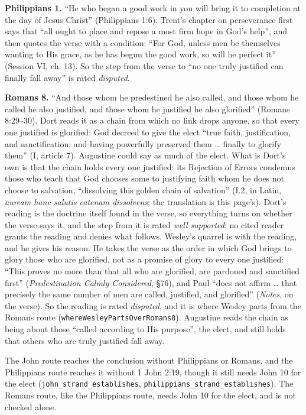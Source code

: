 \documentclass[11pt]{article}
\begin{document}
\textbf{Philippians 1.} “He who began a good work in you will bring it to completion at the day of Jesus Christ” (Philippians 1:6). Trent’s chapter on perseverance first says that “all ought to place and repose a most firm hope in God’s help”, and then quotes the verse with a condition: “For God, unless men be themselves wanting to His grace, as he has begun the good work, so will he perfect it” (Session VI, ch. 13). So the step from the verse to “no one truly justified can finally fall away” is rated \emph{disputed}.

\textbf{Romans 8.} “And those whom he predestined he also called, and those whom he called he also justified, and those whom he justified he also glorified” (Romans 8:29–30). Dort reads it as a chain from which no link drops anyone, so that every one justified is glorified: God decreed to give the elect “true faith, justification, and sanctification; and having powerfully preserved them … finally to glorify them” (I, article 7). Augustine could say as much of the elect. What is Dort’s own is that the chain holds every one justified: its Rejection of Errors condemns those who teach that God chooses some to justifying faith whom he does not choose to salvation, “dissolving this golden chain of salvation” (I.2, in Latin, \emph{auream hanc salutis catenam dissolvens}; the translation is this page’s). Dort’s reading is the doctrine itself found in the verse, so everything turns on whether the verse says it, and the step from it is rated \emph{well supported}: no cited reader grants the reading and denies what follows. Wesley’s quarrel is with the reading, and he gives his reason. He takes the verse as the order in which God brings to glory those who are glorified, not as a promise of glory to every one justified: “This proves no more than that all who are glorified, are pardoned and sanctified first” (\emph{Predestination Calmly Considered}, §76), and Paul “does not affirm … that precisely the same number of men are called, justified, and glorified” (\emph{Notes}, on the verse). So the reading is rated \emph{disputed}, and it is where Wesley parts from the Romans route (\texttt{where\allowbreak{}Wesley\allowbreak{}Parts\allowbreak{}Over\allowbreak{}Romans8}). Augustine reads the chain as being about those “called according to His purpose”, the elect, and still holds that others who are truly justified fall away.

The John route reaches the conclusion without Philippians or Romans, and the Philippians route reaches it without 1 John 2:19, though it still needs John 10 for the elect (\texttt{john\_\allowbreak{}strand\_\allowbreak{}establishes}, \texttt{philippians\_\allowbreak{}strand\_\allowbreak{}establishes}). The Romans route, like the Philippians route, needs John 10 for the elect, and is not checked alone.
\end{document}

